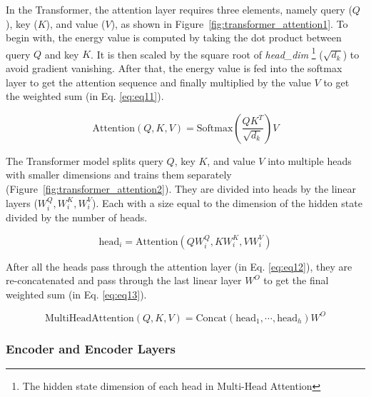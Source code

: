 In the Transformer, the attention layer requires three elements, namely query ($Q$), key ($K$), and value ($V$), as shown in Figure~\ref{fig:transformer_attention1}. To begin with, the energy value is computed by taking the dot product between query $Q$ and key $K$. It is then scaled by the square root of \textit{head\_dim} \footnote{The hidden state dimension of each head in Multi-Head Attention} ($\sqrt{d_k}$) to avoid gradient vanishing. After that, the energy value is fed into the softmax layer to get the attention sequence and finally multiplied by the value $V$ to get the weighted sum (in Eq. \ref{eq:eq11}).

\begin{equation}
\text{Attention}(Q, K, V) = \text{Softmax}\left(\frac{QK^T}{\sqrt{d_k}}\right)V \label{eq:eq11}
\end{equation}

The Transformer model splits query $Q$, key $K$, and value $V$ into multiple heads with smaller dimensions and trains them separately (Figure~\ref{fig:transformer_attention2}). They are divided into heads by the linear layers ($W_i^Q, W_i^K, W_i^V$). Each with a size equal to the dimension of the hidden state divided by the number of heads. 

\begin{equation}
\text{head}_i = \text{Attention}(QW_i^Q, KW_i^K, VW_i^V) \label{eq:eq12}
\end{equation}

After all the heads pass through the attention layer (in Eq. \ref{eq:eq12}), they are re-concatenated and pass through the last linear layer $W^O$ to get the final weighted sum (in Eq. \ref{eq:eq13}).

\begin{equation}
\text{MultiHeadAttention}(Q, K, V) = \text{Concat}(\text{head}_1, \cdots, \text{head}_h)W^O
\label{eq:eq13}
\end{equation}

\subsubsection{Encoder and Encoder Layers}

